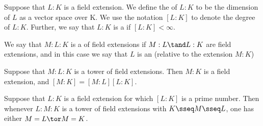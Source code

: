 \documentclass[a4paper]{article}
\begin{document}
\begin{tdefinition}
  Suppose that $L: K$ is a field extension.
  We define the  of $L: K$ to be the dimension of $L$ as a vector space over K.
  We use the notation $[L : K]$ to denote the degree of $L : K$.
  Further, we say that $L : K$ is a  if $[L: K] <\infty$.
\end{tdefinition}

\begin{tdefinition}
  We say that $M : L : K$ is a  of field extensions if $M : L \tand L: K$ are field extensions, and in this case we say that $L$ is an  (relative to the extension $M : K$)
\end{tdefinition}

\begin{ttheorem}
  Suppose that $ M :L: K $ is a tower of field extensions.
  Then $ M : K $ is a field extension, and $ [M : K] = [M : L][L: K] $.
\end{ttheorem}

\begin{tcorollary}
  Suppose that $L:K$ is a field extension for which $[L: K]$ is a prime number.
  Then whenever $L : M : K$ is a tower of field extensions with $K \sseq M \sseq L$, one has either $M= L \tor M= K$.
\end{tcorollary}
\end{document}
